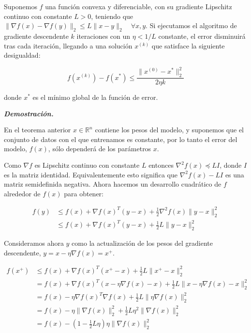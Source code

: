 \begin{teorema}\label{proof:gdconvex}
    Suponemos $f$ una función convexa y diferenciable, con su gradiente Lipschitz continuo con constante $L>0$, teniendo que $\| \nabla f(x) - \nabla f(y) \|_2 \leq L \|x-y\|_2 \quad \forall x, y$. Si ejecutamos el algoritmo de gradiente descendente $k$ iteraciones con un $\eta<1/L$ constante, el error disminuirá tras cada iteración, llegando a una solución $x^{(k)}$ que satisface la siguiente desigualdad:

    $$f(x^{(k)})-f(x^*) \leq \frac{\|x^{(0)}-x^* \|^2_2}{2\eta k}$$

    donde $x^*$ es el mínimo global de la función de error. 
\end{teorema}

\vspace{1cm}

\begin{flushleft}
   \textbf{\textit{Demostración.}}
\end{flushleft} 



En el teorema anterior $x \in \mathbb{R}^n$ contiene los pesos del modelo, y suponemos que el conjunto de datos con el que entrenamos es constante, por lo tanto el error del modelo, $f(x)$, sólo dependerá de los parámetros $x$.

Como $\nabla f$ es Lipschitz continuo con constante $L$ entonces $\nabla ^2 f(x) \preceq LI$, donde $I$ es la matriz identidad. Equivalentemente esto significa que $\nabla ^2 f(x) -LI$ es una matriz semidefinida negativa. Ahora hacemos un desarrollo cuadrático de $f$ alrededor de $f(x)$ para obtener:

\begin{align*}
    f(y) &\leq f(x) + \nabla f(x)^T (y-x) +\frac{1}{2}\nabla^2 f(x) \|y-x\|^2_2  \\
    &\leq f(x) + \nabla f(x)^T(y-x) + \frac{1}{2}L \|y - x \|^2_2
\end{align*}

Consideramos ahora $y$ como la actualización de los pesos del gradiente descendente, $y=x - \eta \nabla f(x)=x^+$. 


\begin{align*}
    f(x^+) &\leq f(x) + \nabla f(x)^T(x^+-x) + \frac{1}{2}L \|x^+ - x \|^2_2 \\
    &= f(x) + \nabla f(x)^T(x - \eta \nabla f(x) -x) + \frac{1}{2}L \|x - \eta \nabla f(x) - x \|^2_2 \\
    &= f(x) - \eta \nabla f(x)^T \nabla f(x) + \frac{1}{2} L \| \eta \nabla f(x) \|^2_2 \\
    &= f(x) - \eta \| \nabla f(x) \|^2_2 + \frac{1}{2} L \eta^2 \| \nabla f(x) \|^2_2 \\
    &= f(x) - (1- \frac{1}{2}L \eta) \eta \| \nabla f(x) \|^2_2
\end{align*}

